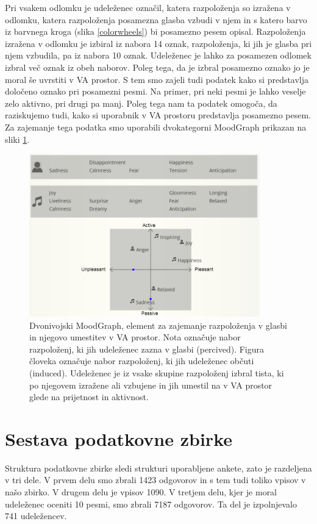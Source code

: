 \documentclass[a4paper, 12pt]{book}
\begin{document}
{Pri vsakem odlomku je udeleženec označil, katera razpoloženja so izražena v odlomku, katera razpoloženja posamezna glasba vzbudi v njem in s katero barvo iz barvnega kroga (slika \ref{colorwheels}) bi posamezno pesem opisal. Razpoloženja izražena v odlomku je izbiral iz nabora 14 oznak, razpoloženja, ki jih je glasba pri njem vzbudila, pa iz nabora 10 oznak. Udeleženec je lahko za posamezen odlomek izbral več oznak iz obeh naborov. Poleg tega, da je izbral posamezno oznako jo je moral še uvrstiti v VA prostor. S tem smo zajeli tudi podatek kako si predstavlja določeno oznako pri posamezni pesmi. Na primer, pri neki pesmi je lahko veselje zelo aktivno, pri drugi pa manj. Poleg tega nam ta podatek omogoča, da raziskujemo tudi, kako si uporabnik v VA prostoru predstavlja posamezno pesem. Za zajemanje tega podatka smo uporabili dvokategorni MoodGraph prikazan na sliki \ref{moodgraphdvo}.

\begin{figure}[htb]
\centering
\includegraphics[width=10cm]{images/moodgraphdvo.png}

\caption{Dvonivojski MoodGraph, element za zajemanje razpoloženja v glasbi in njegovo umestitev v VA prostor. Nota označuje nabor razpoloženj, ki jih udeleženec zazna v glasbi (percived). Figura človeka označuje nabor razpoloženj, ki jih udeleženec občuti (induced). Udeleženec je iz vsake skupine razpoloženj izbral tista, ki po njegovem izražene ali vzbujene in jih umestil na v VA prostor glede na prijetnost in aktivnost.}
\label{moodgraphdvo}
\end{figure}


\section{Sestava podatkovne zbirke}

Struktura podatkovne zbirke sledi strukturi uporabljene ankete, zato je razdeljena v tri dele.  V prvem delu smo zbrali 1423 odgovorov in s tem tudi toliko vpisov v našo zbirko. V drugem delu je vpisov 1090. V tretjem delu, kjer je moral udeleženec oceniti 10 pesmi, smo zbrali 7187 odgovorov. Ta del je izpolnjevalo 741 udeležencev.

}
\end{document}

